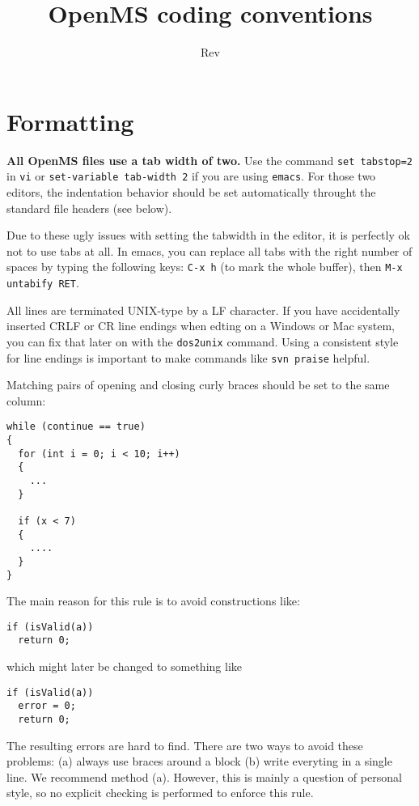 \documentclass[a4]{article}
\title{OpenMS coding conventions}
\date{$ $Rev$ $}
\author{}
\begin{document}
\maketitle

\section{Formatting}

{\bf All OpenMS files use a tab width of two.} Use the command {\tt set tabstop=2} in
{\tt vi} or {\tt set-variable tab-width 2} if you are using {\tt emacs}. For
those two editors, the indentation behavior should be set automatically
throught the standard file headers (see below).

Due to these ugly issues with setting the tabwidth in the editor, it is
perfectly ok not to use tabs at all.  In emacs, you can replace all tabs with
the right number of spaces by typing the following keys: \texttt{C-x h} (to
mark the whole buffer), then \texttt{M-x untabify RET}.

All lines are terminated UNIX-type by a LF character.  If you have
accidentally inserted CRLF or CR line endings when edting on a Windows or Mac
system, you can fix that later on with the \verb|dos2unix| command.  Using a
consistent style for line endings is important to make commands like
\verb|svn praise| helpful.

Matching pairs of opening and closing curly braces should be set to the same
column:
\begin{verbatim}
while (continue == true)
{
  for (int i = 0; i < 10; i++)
  {
    ...
  }

  if (x < 7)
  {
    ....
  }
}
\end{verbatim}
The main reason for this rule is to avoid constructions like:

\begin{verbatim}
if (isValid(a))
  return 0;
\end{verbatim}

which might later be changed to something like

\begin{verbatim}
if (isValid(a))
  error = 0;
  return 0;
\end{verbatim}

The resulting errors are hard to find. There are two ways to avoid these
problems: (a) always use braces around a block (b) write everyting in a single
line. We recommend method (a).
However, this is mainly a question of personal style, so no explicit checking
is performed to enforce this rule.
\end{document}
